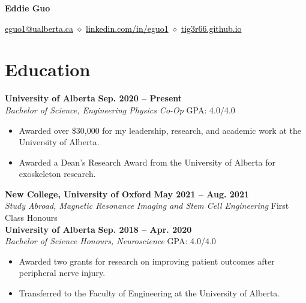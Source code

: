 \documentclass{article}
\begin{document}
\thispagestyle{plain}
\begin{center}
\LARGE \textbf{\textcolor{my_colour}{Eddie Guo}} \vspace{.2em}

\normalfont \normalsize
\href{mailto:eguo1@ualberta.ca}{\textcolor{black}{eguo1@ualberta.ca}}
    \hspace{.15em} $\diamond$ \hspace{.15em}
\href{https://www.linkedin.com/in/eguo1}{\textcolor{black}{linkedin.com/in/eguo1}}
    \hspace{.15em} $\diamond$ \hspace{.15em}
\href{https://tig3r66.github.io/index.html}{\textcolor{black}{tig3r66.github.io}}
\end{center}

\vspace{-1em}


\section*{\textcolor{my_colour}{Education}}
\vspace{-.25em} \hrulefill \vspace{.25em}

\textbf{University of Alberta} \hfill \textbf{Sep. 2020 -- Present} \\
\textit{Bachelor of Science, Engineering Physics Co-Op} \hfill GPA: 4.0/4.0
\begin{itemize}
    \item Awarded over \$30,000 for my leadership, research, and academic work at the University of Alberta.
    \item Awarded a Dean's Research Award from the University of Alberta for exoskeleton research.
\end{itemize} \vspace{1em}

\textbf{New College, University of Oxford} \hfill \textbf{May 2021 -- Aug. 2021} \\
\textit{Study Abroad, Magnetic Resonance Imaging and Stem Cell Engineering} \hfill First Class Honours \\

\textbf{University of Alberta} \hfill \textbf{Sep. 2018 -- Apr. 2020} \\
\textit{Bachelor of Science Honours, Neuroscience} \hfill GPA: 4.0/4.0
\begin{itemize}
    \item Awarded two grants for research on improving patient outcomes after peripheral nerve injury.
    \item Transferred to the Faculty of Engineering at the University of Alberta.
\end{itemize}
\end{document}
